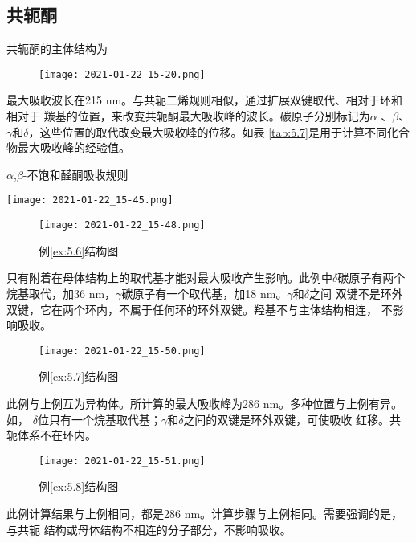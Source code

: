 \subsection{共轭酮}
共轭酮的主体结构为
\begin{figure}[h!]
    \centering
    \texttt{[image: 2021-01-22\_15-20.png]}
\end{figure}

最大吸收波长在215 nm。与共轭二烯规则相似，通过扩展双键取代、相对于环和相对于
羰基的位置，来改变共轭酮最大吸收峰的波长。碳原子分别标记为$\alpha$
、$\beta$、$\gamma$和$\delta$，这些位置的取代改变最大吸收峰的位移。如表
\ref{tab:5.7}是用于计算不同化合物最大吸收峰的经验值。
\begin{table}[htbp]
    \centering
    \caption{$\alpha$,$\beta$-不饱和醛酮吸收规则}
    \label{tab:5.7}
    \texttt{[image: 2021-01-22\_15-45.png]}
\end{table}
\begin{example}\label{ex:5.6}
    \begin{figure}[h!]
        \centering
        \texttt{[image: 2021-01-22\_15-48.png]}
        \caption{例\ref{ex:5.6}结构图}
    \end{figure}
只有附着在母体结构上的取代基才能对最大吸收产生影响。此例中$\delta$碳原子有两个
烷基取代，加36 nm，$\gamma$碳原子有一个取代基，加18 nm。$\gamma$和$\delta$之间
双键不是环外双键，它在两个环内，不属于任何环的环外双键。羟基不与主体结构相连，
不影响吸收。
\end{example}
\begin{example}\label{ex:5.7}
    \begin{figure}[h!]
        \centering
        \texttt{[image: 2021-01-22\_15-50.png]}
        \caption{例\ref{ex:5.7}结构图}
    \end{figure}
此例与上例互为异构体。所计算的最大吸收峰为286 nm。多种位置与上例有异。如，
$\delta$位只有一个烷基取代基；$\gamma$和$\delta$之间的双键是环外双键，可使吸收
红移。共轭体系不在环内。
\end{example}
\begin{example}\label{ex:5.8}
    \begin{figure}[h!]
        \centering
        \texttt{[image: 2021-01-22\_15-51.png]}
        \caption{例\ref{ex:5.8}结构图}
    \end{figure}
此例计算结果与上例相同，都是286 nm。计算步骤与上例相同。需要强调的是，与共轭
结构或母体结构不相连的分子部分，不影响吸收。
\end{example}

